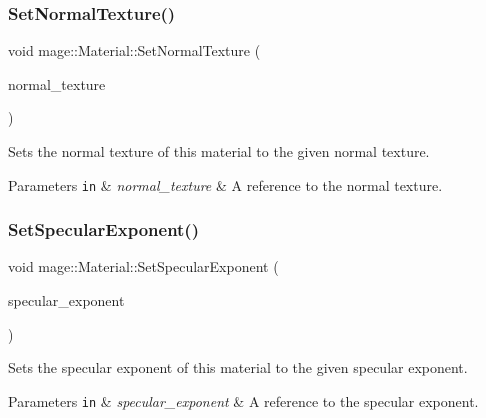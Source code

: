 \subsubsection{\texorpdfstring{Set\+Normal\+Texture()}{SetNormalTexture()}}
{\footnotesize\ttfamily void mage\+::\+Material\+::\+Set\+Normal\+Texture (\begin{DoxyParamCaption}\item[{const \hyperlink{namespacemage_a1e01ae66713838a7a67d30e44c67703e}{Shared\+Ptr}$<$ const \hyperlink{classmage_1_1_texture}{Texture} $>$ \&}]{normal\+\_\+texture }\end{DoxyParamCaption})}

Sets the normal texture of this material to the given normal texture.


\begin{DoxyParams}[1]{Parameters}
\mbox{\tt in}  & {\em normal\+\_\+texture} & A reference to the normal texture. \\
\hline
\end{DoxyParams}
\hypertarget{structmage_1_1_material_adba6254741807b4cd8abe3a118c863d2}{}\label{structmage_1_1_material_adba6254741807b4cd8abe3a118c863d2} 
\subsubsection{\texorpdfstring{Set\+Specular\+Exponent()}{SetSpecularExponent()}}
{\footnotesize\ttfamily void mage\+::\+Material\+::\+Set\+Specular\+Exponent (\begin{DoxyParamCaption}\item[{\hyperlink{namespacemage_a6a44ad388483959dc4dff9f2aef91431}{f32}}]{specular\+\_\+exponent }\end{DoxyParamCaption})\hspace{0.3cm}{\ttfamily [noexcept]}}

Sets the specular exponent of this material to the given specular exponent.


\begin{DoxyParams}[1]{Parameters}
\mbox{\tt in}  & {\em specular\+\_\+exponent} & A reference to the specular exponent. \\
\hline
\end{DoxyParams}
\hypertarget{structmage_1_1_material_ac615e33c8e17149345488fed5c16dc7b}{}\label{structmage_1_1_material_ac615e33c8e17149345488fed5c16dc7b} 
